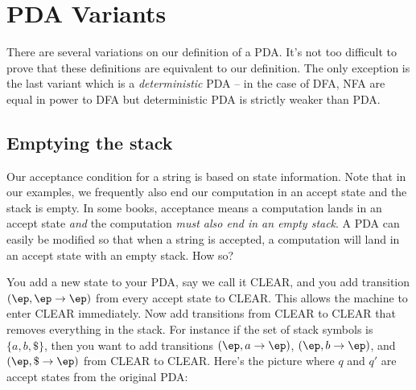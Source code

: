 \section{PDA Variants}

There are several variations on our definition of a PDA. 
It's not too difficult to prove that these definitions are equivalent to our 
definition.
The only exception is the last variant which is a
\textit{deterministic} PDA --
in the case of DFA, NFA are equal in power to DFA but
deterministic PDA is strictly weaker than PDA.

\newpage
\subsection{Emptying the stack}

Our acceptance condition for a string is based on state information.
Note that in our examples, we frequently also end our computation in an
accept state and the stack is empty.
In some books, acceptance means a computation lands in an accept state 
\textit{ and} the computation \textit{must also end in an empty stack}.
A PDA can easily be modified so that when a string is accepted, a computation
will land in an accept state with an empty stack.
How so?

You add a new state to your PDA, say we call it CLEAR, and you add
transition $(\ep, \ep \rightarrow \ep)$ from every accept state to CLEAR.
This allows the machine to enter CLEAR immediately.
Now add transitions from CLEAR to CLEAR that removes everything in the stack.
For instance if the set of stack symbols is $\{a, b, \$\}$, then you want to 
add transitions $(\ep, a \rightarrow \ep)$, $(\ep, b \rightarrow \ep)$,
and $(\ep, \$ \rightarrow \ep)$ from CLEAR to CLEAR.
Here's the picture where $q$ and $q'$ are accept states from the original PDA:

\begin{center}
\end{center}
    

